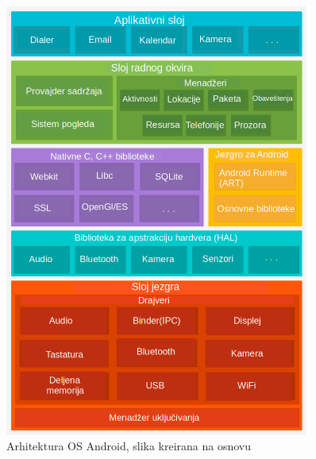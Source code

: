 \documentclass[android.tex]{subfiles}
\begin{document}
\begin{figure}[!ht]
  \centering
  \label{fig:arhitektura}
  \includegraphics[width=0.9\textwidth]{arhitekturaSrp.png}
  \caption{Arhitektura OS Android, slika kreirana na osnovu \cite{sajt:androidDevelopersArhitektura}}
\end{figure}
\end{document}
